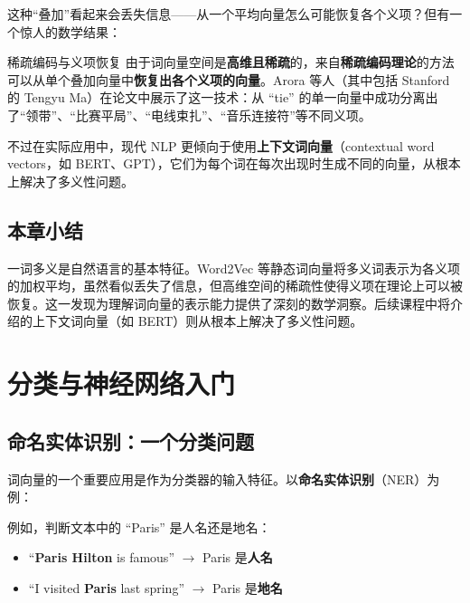 \documentclass[a4paper]{article}
\begin{document}
这种``叠加''看起来会丢失信息——从一个平均向量怎么可能恢复各个义项？但有一个惊人的数学结果：

\begin{knowledgebox}{稀疏编码与义项恢复}
由于词向量空间是\textbf{高维且稀疏}的，来自\textbf{稀疏编码理论}的方法可以从单个叠加向量中\textbf{恢复出各个义项的向量}。Arora 等人（其中包括 Stanford 的 Tengyu Ma）在论文中展示了这一技术：从 ``tie'' 的单一向量中成功分离出了``领带''、``比赛平局''、``电线束扎''、``音乐连接符''等不同义项。
\end{knowledgebox}

不过在实际应用中，现代 NLP 更倾向于使用\textbf{上下文词向量}（contextual word vectors，如 BERT、GPT），它们为每个词在每次出现时生成不同的向量，从根本上解决了多义性问题。

\subsection{本章小结}

一词多义是自然语言的基本特征。Word2Vec 等静态词向量将多义词表示为各义项的加权平均，虽然看似丢失了信息，但高维空间的稀疏性使得义项在理论上可以被恢复。这一发现为理解词向量的表示能力提供了深刻的数学洞察。后续课程中将介绍的上下文词向量（如 BERT）则从根本上解决了多义性问题。


\section{分类与神经网络入门}

\subsection{命名实体识别：一个分类问题}

词向量的一个重要应用是作为分类器的输入特征。以\textbf{命名实体识别}（NER）为例：





例如，判断文本中的 ``Paris'' 是人名还是地名：
\begin{itemize}
    \item ``\textbf{Paris Hilton} is famous'' $\rightarrow$ Paris 是\textbf{人名}
    \item ``I visited \textbf{Paris} last spring'' $\rightarrow$ Paris 是\textbf{地名}
\end{itemize}
\end{document}
